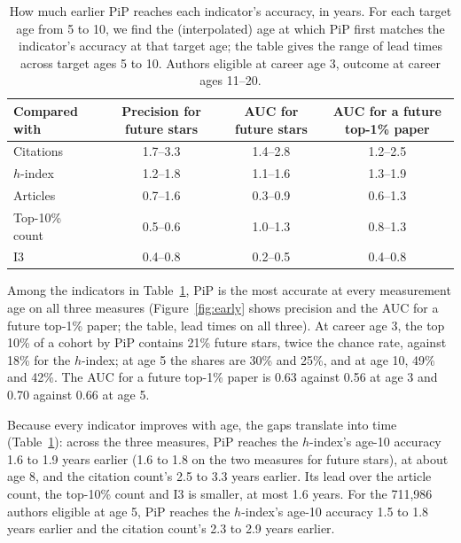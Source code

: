 \documentclass[11pt]{article}
\begin{document}
\begin{table}[t]
  \centering
  \small
  \caption{How much earlier PiP reaches each indicator's accuracy, in years. For each target age from 5 to 10, we find
  the (interpolated) age at which PiP first matches the indicator's accuracy at that target age; the table gives the
  range of lead times across target ages 5 to 10. Authors eligible at career age 3, outcome at career ages 11--20.}
  \label{tab:early}
  \begin{tabular}{lccc}
    \toprule
    Compared with & Precision for future stars & AUC for future stars & AUC for a future top-1\% paper \\
    \midrule
    Citations & 1.7--3.3 & 1.4--2.8 & 1.2--2.5 \\
    $h$-index & 1.2--1.8 & 1.1--1.6 & 1.3--1.9 \\
    Articles & 0.7--1.6 & 0.3--0.9 & 0.6--1.3 \\
    Top-10\% count & 0.5--0.6 & 1.0--1.3 & 0.8--1.3 \\
    I3 & 0.4--0.8 & 0.2--0.5 & 0.4--0.8 \\
    \bottomrule
  \end{tabular}
\end{table}

Among the indicators in Table~\ref{tab:early}, PiP is the most accurate at every measurement age on all three measures
(Figure~\ref{fig:early} shows precision and the AUC for a future top-1\% paper; the table, lead times on all three). At
career age 3,
the top 10\% of a cohort by PiP contains 21\% future stars, twice the chance rate, against 18\% for the $h$-index; at
age 5 the shares are 30\% and 25\%, and at age 10, 49\% and 42\%. The AUC for a future top-1\% paper is 0.63 against
0.56 at age 3 and 0.70 against 0.66 at age 5.

Because every indicator improves with age, the gaps translate into time (Table~\ref{tab:early}): across the three
measures, PiP reaches the $h$-index's age-10 accuracy 1.6 to 1.9 years earlier (1.6 to 1.8 on the two measures for
future stars), at about age 8, and the citation count's 2.5 to 3.3 years earlier. Its lead over the article count, the
top-10\% count and I3 is smaller, at most 1.6 years. For the 711,986 authors eligible at age 5, PiP reaches
the $h$-index's age-10 accuracy 1.5 to 1.8 years earlier and the citation count's 2.3 to 2.9 years earlier.
\end{document}
